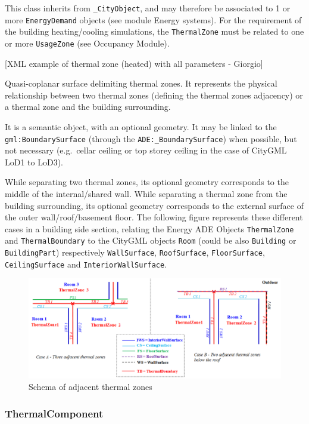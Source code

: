 \documentclass[a4paper,12pt]{article}
\begin{document}
This class inherits from \texttt{\_CityObject}, and may therefore be
associated to 1 or more \texttt{EnergyDemand} objects (see module Energy
systems). For the requirement of the building heating/cooling
simulations, the \texttt{ThermalZone} must be related to one or more
\texttt{UsageZone} (see Occupancy Module).

{[}XML example of thermal zone (heated) with all parameters - Giorgio{]}

Quasi-coplanar surface delimiting thermal zones. It represents the
physical relationship between two thermal zones (defining the thermal
zones adjacency) or a thermal zone and the building surrounding.

It is a semantic object, with an optional geometry. It may be linked to
the \texttt{gml:BoundarySurface} (through the
\texttt{ADE:\_BoundarySurface}) when possible, but not necessary
(e.g.~cellar ceiling or top storey ceiling in the case of CityGML LoD1
to LoD3).

While separating two thermal zones, its optional geometry corresponds to
the middle of the internal/shared wall. While separating a thermal zone
from the building surrounding, its optional geometry corresponds to the
external surface of the outer wall/roof/basement floor. The following
figure represents these different cases in a building side section,
relating the Energy ADE Objects \texttt{ThermalZone} and
\texttt{ThermalBoundary} to the CityGML objects \texttt{Room} (could be
also \texttt{Building} or \texttt{BuildingPart}) respectively
\texttt{WallSurface}, \texttt{RoofSurface}, \texttt{FloorSurface},
\texttt{CeilingSurface} and \texttt{InteriorWallSurface}.

\begin{figure}[htbp]
\centering
\includegraphics{fig/ThermalZoneAdjacency.png}
\caption{Schema of adjacent thermal zones}
\end{figure}

\subsubsection{ThermalComponent}\label{thermalcomponent}
\end{document}
